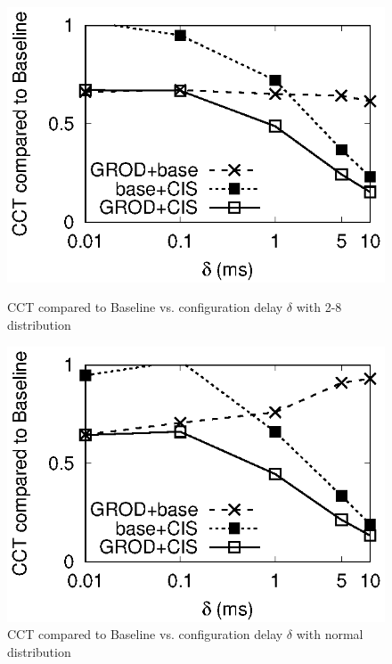 \begin{figure}
\centering
\begin{minipage}[c]{0.23\textwidth}
\centering

\includegraphics[width=1\textwidth]{28_delta_cct.eps}
\caption{CCT compared to Baseline vs. configuration delay $\delta$ with 2-8 distribution}\label{fig:28_delta_cct}
\end{minipage}
\hspace{1mm}
\begin{minipage}[c]{0.23\textwidth}
\centering

\includegraphics[width=1\textwidth]{normal_delta_cct.eps}
\caption{CCT compared to Baseline vs. configuration delay $\delta$ with normal distribution}\label{fig:normal_delta_cct}
\end{minipage}
\hspace{1mm}
\begin{minipage}[c]{0.23\textwidth}
\centering


\end{minipage}
\end{figure}
